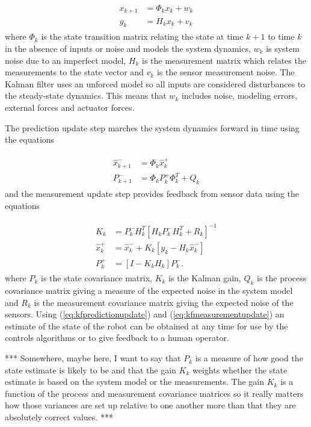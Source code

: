 \begin{align}
\label{eq:kfstatemodel}
\begin{split}
x_{k+1} &= \Phi_kx_k + w_k \\
y_k &= H_kx_k + v_k
\end{split}
\end{align}
where $\Phi_k$ is the state transition matrix relating the state at time $k+1$ to time $k$ in the absence of inputs or noise and models the system dynamics, $w_k$ is system noise due to an imperfect model, $H_k$ is the measurement matrix which relates the measurements to the state vector and $v_k$ is the sensor measurement noise. The Kalman filter uses an unforced model so all inputs are considered disturbances to the steady-state dynamics. This means that $w_k$ includes noise, modeling errors, external forces and actuator forces.

The prediction update step marches the system dynamics forward in time using the equations

\begin{align}
\label{eq:kfpredictionupdate}
\begin{split}
\hat{x}_{k+1}^- &= \Phi_k\hat{x}_k^+ \\
P_{k+1}^- &= \Phi_kP_k^+\Phi_k^T + Q_k
\end{split}
\end{align}
and the measurement update step provides feedback from sensor data using the equations

\begin{align}
\label{eq:kfmeasurementupdate}
\begin{split}
K_k &= P_k^-H_k^T\left[H_kP_k^-H_k^T + R_k\right]^{-1} \\
\hat{x}_k^+ &= \hat{x}_k^- + K_k\left[y_k - H_k\hat{x}_k^-\right] \\
P_k^+ &= \left[I - K_kH_k\right]P_k^-.
\end{split}
\end{align}
where $P_k$ is the state covariance matrix, $K_k$ is the Kalman gain, $Q_k$ is the process covariance matrix giving a measure of the expected noise in the system model and $R_k$ is the measurement covariance matrix giving the expected noise of the sensors. Using (\ref{eq:kfpredictionupdate}) and (\ref{eq:kfmeasurementupdate}) an estimate of the state of the robot can be obtained at any time for use by the controls algorithms or to give feedback to a human operator.

*** Somewhere, maybe here, I want to say that $P_k$ is a measure of how good the state estimate is likely to be and that the gain $K_k$ weights whether the state estimate is based on the system model or the measurements. The gain $K_k$ is a function of the process and measurement covariance matrices so it really matters how those variances are set up relative to one another more than that they are absolutely correct values. ***

